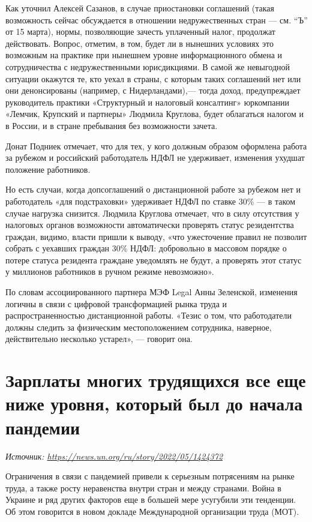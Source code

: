 Как уточнил Алексей Сазанов, в случае приостановки соглашений (такая возможность сейчас обсуждается в отношении недружественных стран — см. “Ъ” от 15 марта), нормы, позволяющие зачесть уплаченный налог, продолжат действовать. Вопрос, отметим, в том, будет ли в нынешних условиях это возможным на практике при нынешнем уровне информационного обмена и сотрудничества с недружественными юрисдикциями. В самой же невыгодной ситуации окажутся те, кто уехал в страны, с которым таких соглашений нет или они денонсированы (например, с Нидерландами),— тогда доход, предупреждает руководитель практики «Структурный и налоговый консалтинг» юркомпании «Лемчик, Крупский и партнеры» Людмила Круглова, будет облагаться налогом и в России, и в стране пребывания без возможности зачета.

\begin{fancyquotes}
    Донат Подниек отмечает, что для тех, у кого должным образом оформлена работа за рубежом и российский работодатель НДФЛ не удерживает, изменения ухудшат положение работников.
\end{fancyquotes}

Но есть случаи, когда допсоглашений о дистанционной работе за рубежом нет и работодатель «для подстраховки» удерживает НДФЛ по ставке 30\% — в таком случае нагрузка снизится. Людмила Круглова отмечает, что в силу отсутствия у налоговых органов возможности автоматически проверять статус резидентства граждан, видимо, власти пришли к выводу, «что ужесточение правил не позволит собрать с уехавших граждан 30\% НДФЛ: добровольно в массовом порядке о потере статуса резидента граждане уведомлять не будут, а проверять этот статус у миллионов работников в ручном режиме невозможно».

По словам ассоциированного партнера МЭФ Legal Анны Зеленской, изменения логичны в связи с цифровой трансформацией рынка труда и распространенностью дистанционной работы. «Тезис о том, что работодатели должны следить за физическим местоположением сотрудника, наверное, действительно несколько устарел», — говорит она.

\newpage
\section{Зарплаты многих трудящихся все еще ниже уровня, который был до начала пандемии}

 {\it Источник: \url{https://news.un.org/ru/story/2022/05/1424372}}


\begin{fancyquotes}
    Ограничения в связи с пандемией привели к серьезным потрясениям на рынке труда, а также росту неравенства внутри стран и между странами. Война в Украине и ряд других факторов еще в большей мере усугубили эти тенденции. Об этом говорится в новом докладе Международной организации труда (МОТ).
\end{fancyquotes}

